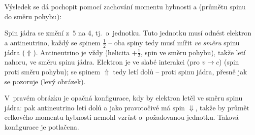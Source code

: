 Výsledek se dá pochopit pomocí zachování momentu hybnosti a  (průmětu spinu do směru pohybu):
\begin{center}
\end{center}
Spin jádra se změní z~$5$ na $4$, tj.\ o~jednotku. Tuto jednotku musí odnést elektron a antineutrino, každý se spinem $\tfrac12$ -- oba spiny tedy musí mířit \emph{ve směru} spinu jádra ($\Uparrow$). Antineutrino je vždy  (helicita $+\tfrac12$, spin ve směru pohybu), takže letí nahoru, ve směru spinu jádra. Elektron je ve slabé interakci (pro $v\to c$)  (spin proti směru pohybu); se spinem $\Uparrow$ tedy letí dolů -- proti spinu jádra, přesně jak se pozoruje (levý obrázek).

V~pravém obrázku je opačná konfigurace, kdy by elektron letěl ve směru spinu jádra: pak antineutrino letí dolů a jako pravotočivé má spin $\Downarrow$, takže by průmět celkového momentu hybnosti nemohl vzrůst o~požadovanou jednotku. Taková konfigurace je potlačena.

